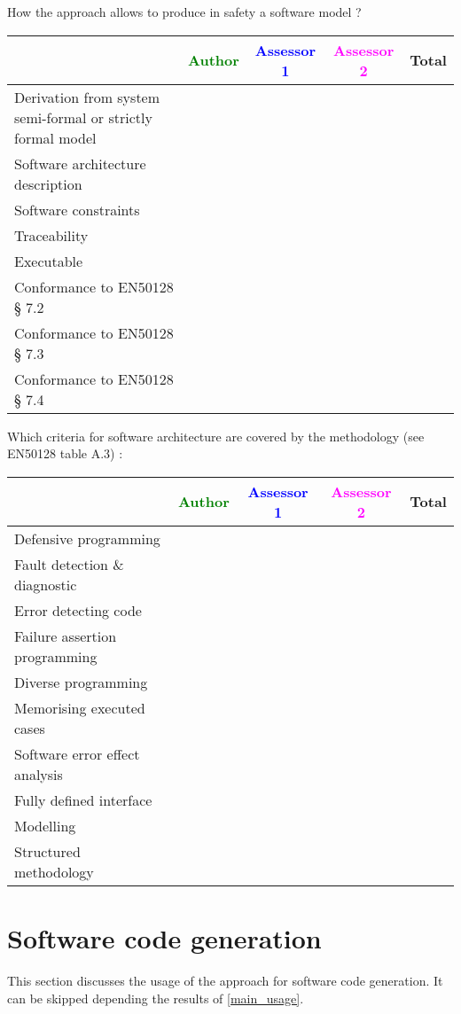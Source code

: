 How the approach allows to  produce in safety a software model ?

\begin{tabular}{|l | c | c | c | c|}
\hline
& \textcolor{green}{Author} & \textcolor{blue}{Assessor 1} & \textcolor{magenta}{Assessor 2} & Total \\
\hline
Derivation from system semi-formal or strictly formal model  & & & &  \\
\hline 
Software architecture description  & & & &  \\
\hline
Software constraints  & & & &  \\
\hline
Traceability  & & & &  \\
\hline
Executable  & & & &  \\
\hline
Conformance to EN50128 § 7.2  & & & &  \\
\hline
Conformance to EN50128 § 7.3  & & & &  \\
\hline
Conformance to EN50128 § 7.4  & & & &  \\
\hline
\end{tabular}

Which criteria for software architecture are covered by the methodology
(see EN50128 table A.3) :

\begin{tabular}{|l | c | c | c | c|}
\hline
& \textcolor{green}{Author} & \textcolor{blue}{Assessor 1} & \textcolor{magenta}{Assessor 2} & Total \\
\hline
Defensive programming  & & & &  \\
\hline 
Fault detection \& diagnostic  & & & &  \\
\hline
Error detecting code  & & & &  \\
\hline
Failure assertion programming & & & &  \\
\hline
Diverse programming & & & &  \\
\hline
Memorising executed cases & & & &  \\
\hline
Software error effect analysis & & & &  \\
\hline
Fully defined interface & & & &  \\
\hline
Modelling  & & & &  \\
\hline
Structured methodology & & & &  \\
\hline
\end{tabular}

\section{Software code generation}
This section discusses the usage of the approach for software code generation.
It can be skipped depending the results of \ref{main_usage}.


